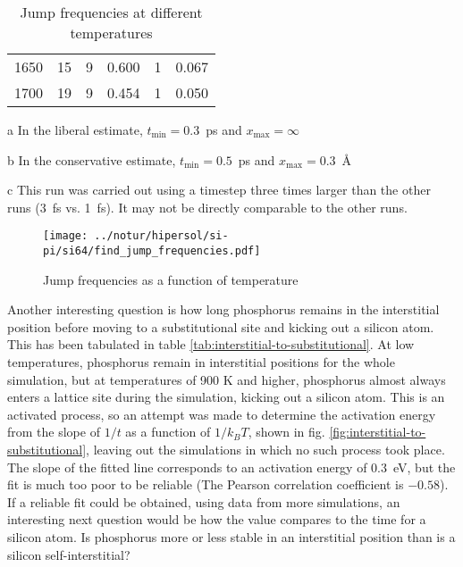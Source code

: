\documentclass[11pt,bibliography=totoc,index=totoc]{scrbook}   %
\begin{document}
\begin{table}[htbp]
\begin{threeparttable}[htbp]
\begin{tabular}{rrrrrr}
        1650 &  15 &  9 & 0.600 &  1 & 0.067 \\
        1700 &  19 &  9 & 0.454 &  1 & 0.050 \\
      \bottomrule
    \end{tabular}
    {\footnotesize
    \begin{tablenotes}
      \item[a] In the liberal estimate, $t_{\text{min}}=0.3$~ps and $x_{\text{max}}=\infty$
      \item[b] In the conservative estimate, $t_{\text{min}}=0.5$~ps and $x_{\text{max}}=0.3$~Å
      \item[c] This run was carried out using a timestep three times larger than the other runs (3~fs vs. 1~fs). 
          It may not be directly comparable to the other runs.
    \end{tablenotes}
    }
  \end{threeparttable}
  \caption{Jump frequencies at different temperatures}
  \label{tab:jumps}
\end{table}

\begin{figure}[htbp]
  \centering
  \texttt{[image: ../notur/hipersol/si-pi/si64/find\_jump\_frequencies.pdf]}
  \caption{Jump frequencies as a function of temperature}
  \label{fig:jumpfreq}
\end{figure}

Another interesting question is how long phosphorus remains in the interstitial position before moving to a substitutional site and kicking out a silicon atom.
This has been tabulated in table \ref{tab:interstitial-to-substitutional}.
At low temperatures, phosphorus remain in interstitial positions for the whole simulation, but at temperatures of 900 K and higher, 
phosphorus almost always enters a lattice site during the simulation, kicking out a silicon atom.
This is an activated process, so an attempt was made to determine the activation energy from the slope of $1/t$ as a function of $1/k_BT$, 
shown in fig. \ref{fig:interstitial-to-substitutional}, leaving out the simulations in which no such process took place.
The slope of the fitted line corresponds to an activation energy of 0.3~eV, but the fit is much too poor to be reliable (The Pearson correlation coefficient is $-0.58$).
If a reliable fit could be obtained, using data from more simulations, an interesting next question would be how the value compares to the time for a silicon atom. Is phosphorus more or less stable in an interstitial position than is a silicon self-interstitial?
\end{document}
